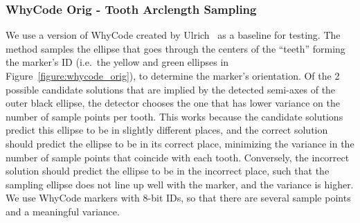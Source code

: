 \subsubsection{WhyCode Orig - Tooth Arclength Sampling}
\label{section:whycode_orig}
We use a version of WhyCode created by Ulrich~\cite{ulrich} as a baseline for testing.
The method samples the ellipse that goes through the centers of the ``teeth'' forming the marker's ID
(i.e.~the yellow and green ellipses in Figure~\ref{figure:whycode_orig}),
to determine the marker's orientation.
Of the 2 possible candidate solutions that are implied by the detected semi-axes of the outer black ellipse, the detector chooses the one that has lower variance on the number of sample points per tooth.
This works because the candidate solutions predict this ellipse to be in slightly different places,
and the correct solution should predict the ellipse to be in its correct place,
minimizing the variance in the number of sample points that coincide with each tooth.
Conversely, the incorrect solution should predict the ellipse to be in the incorrect place,
such that the sampling ellipse does not line up well with the marker, and the variance is higher.
We use WhyCode markers with 8-bit IDs, so that there are several sample points and a meaningful variance.

